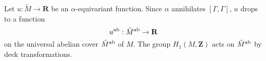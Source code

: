 \documentclass[reqno,11pt]{amsart}
\newcommand{\ZZ}{\mathbf{Z}}
\newcommand{\RR}{\mathbf{R}}
\DeclareMathOperator{\Gal}{Gal}
\theoremstyle{definition}
\numberwithin{equation}{section}
\begin{document}


Let $u: \tilde M \to \RR$ be an $\alpha$-equivariant function.
Since $\alpha$ annihilates $[\Gamma, \Gamma]$, $u$ drops to a function
$$u^{\rm ab}: \tilde M^{\rm ab} \to \RR$$
on the universal abelian cover $\tilde M^{\rm ab}$ of $M$.
The group $H_1(M, \ZZ)$ acts on $\tilde M^{\rm ab}$ by deck transformations.
\end{document}
